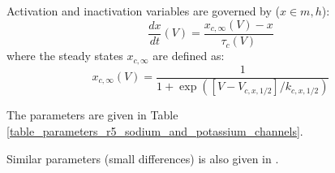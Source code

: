 \documentclass[../../workflow.tex]{subfiles}
\begin{document}
Activation and inactivation variables are governed by ($x \in {m,h}$):
\begin{equation*}
    \frac{dx}{dt}(V) = \frac{x_{c,\infty}(V) - x}{\tau_{c}(V)}
\end{equation*}
where the steady states $x_{c,\infty}$ are defined as:
\begin{equation*}
    x_{c,\infty}(V) = \frac{1}{1 + \exp{([V - V_{c,x,1/2}]/k_{c,x,1/2})}}
\end{equation*}

The parameters are given in Table \ref{table_parameters_r5_sodium_and_potassium_channels}.

\begin{table}[h!]
    \centering
    \caption{Channel parameters for activation and inactivation of sodium and potassium channels.}
    \label{table_parameters_r5_sodium_and_potassium_channels}
\end{table}

\begin{note}
    Similar parameters (small differences) is also given in \cite{linActivityDependentAlternativeSplicing2012}.
\end{note}
\end{document}
